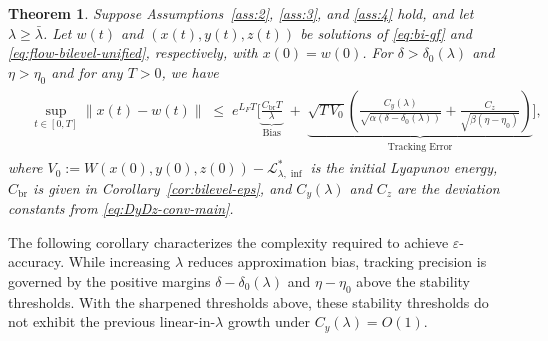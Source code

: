 \documentclass{article}
\newtheorem{theorem}{Theorem}[section]
\newcommand{\1}{\mathbf{1}}
\begin{document}


\begin{theorem}\label{thm:finite-time-tracking}
Suppose Assumptions~\ref{ass:2}, \ref{ass:3}, and \ref{ass:4} hold, and let
$\lambda\ge \bar\lambda$. Let $w(t)$ and $(x(t),y(t),z(t))$ be solutions of
\eqref{eq:bi-gf} and \eqref{eq:flow-bilevel-unified}, respectively, with
$x(0)=w(0)$.
    For $\delta>\delta_0(\lambda)$ and $\eta>\eta_0$ and for any $T > 0$, we have
    \begin{align}
    \begin{aligned}
&\sup_{t\in[0,T]}\|x(t)-w(t)\|
        \;\le\;
        e^{L_F T} \Biggl[
        \underbrace{\frac{C_{\mathrm{br}} T}{\lambda}}_{\text{Bias}}
        \;+\;\underbrace{\sqrt{T\,V_0} \left( \frac{C_y(\lambda)}{\sqrt{\alpha(\delta - \delta_0(\lambda))}} + \frac{C_z}{\sqrt{\beta(\eta - \eta_0)}} \right)}_{\text{Tracking Error}}
        \Biggr],
    \end{aligned}    
    \end{align}
    where $V_0 := W(x(0),y(0),z(0))-\mathcal L_{\lambda,\inf}^{*}$ is the initial Lyapunov energy, $C_{\mathrm{br}}$ is given in Corollary~\ref{cor:bilevel-eps}, and $C_y(\lambda)$ and $C_z$ are the deviation constants from \eqref{eq:DyDz-conv-main}.
\end{theorem}
The following corollary characterizes the complexity required to achieve $\varepsilon$-accuracy. 
While increasing $\lambda$ reduces approximation bias, tracking precision is governed by the positive margins
$\delta-\delta_0(\lambda)$ and $\eta-\eta_0$ above the stability thresholds.
With the sharpened thresholds above, these stability thresholds do not exhibit the previous linear-in-$\lambda$ growth under $C_y(\lambda)=O(1)$.

\end{document}
